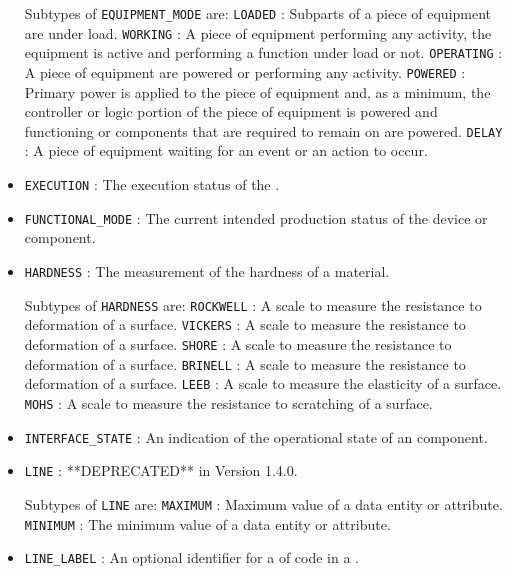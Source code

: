 \begin{itemize}
Subtypes of \texttt{EQUIPMENT_MODE} are: 
\newline\tab \texttt{LOADED} : Subparts of a piece of equipment are under load. 
\newline\tab \texttt{WORKING} : A piece of equipment performing any activity, the equipment is active and performing a function under load or not. 
\newline\tab \texttt{OPERATING} : A piece of equipment are powered or performing any activity. 
\newline\tab \texttt{POWERED} : Primary  power is  applied  to the  piece  of  equipment and,  as  a minimum, the controller or logic portion of the piece of equipment is powered and functioning or components that are required to remain on are powered. 
\newline\tab \texttt{DELAY} : A piece of equipment waiting for an event or an action to occur. 
\item \texttt{EXECUTION} : The execution status of the . 

\item \texttt{FUNCTIONAL_MODE} : The current intended production status of the device or component. 

\item \texttt{HARDNESS} : The measurement of the hardness of a material. 

Subtypes of \texttt{HARDNESS} are: 
\newline\tab \texttt{ROCKWELL} : A scale to measure the resistance to deformation of a surface. 
\newline\tab \texttt{VICKERS} : A scale to measure the resistance to deformation of a surface. 
\newline\tab \texttt{SHORE} : A scale to measure the resistance to deformation of a surface. 
\newline\tab \texttt{BRINELL} : A scale to measure the resistance to deformation of a surface. 
\newline\tab \texttt{LEEB} : A scale to measure the elasticity of a surface. 
\newline\tab \texttt{MOHS} : A scale to measure the resistance to scratching of a surface. 
\item \texttt{INTERFACE_STATE} : An indication of the operational state of an  component. 

\item \texttt{LINE} : **DEPRECATED** in Version 1.4.0. 

Subtypes of \texttt{LINE} are: 
\newline\tab \texttt{MAXIMUM} : Maximum value of a data entity or attribute. 
\newline\tab \texttt{MINIMUM} : The minimum value of a data entity or attribute. 
\item \texttt{LINE_LABEL} : An optional identifier for a  of code in a . 


\end{itemize}
